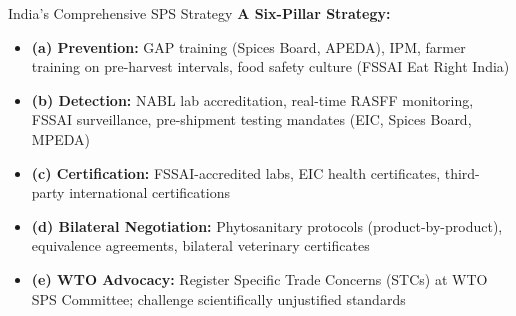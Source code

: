 \documentclass[
  ignorenonframetext,
  aspectratio=169,
]{beamer}
\makeatletter
\providecommand{\tightlist}{%
  \setlength{\itemsep}{0pt}\setlength{\parskip}{0pt}}
\let\quarto@originallabel\label
\DeclareRobustCommand*{\label}[1]{\quarto@originallabel{#1}}
\makeatother
\begin{document}
\begin{frame}{India's Comprehensive SPS Strategy}
\label{indias-comprehensive-sps-strategy}
\textbf{A Six-Pillar Strategy:}

\begin{itemize}
\tightlist
\item
  \textbf{(a) Prevention:} GAP training (Spices Board, APEDA), IPM,
  farmer training on pre-harvest intervals, food safety culture (FSSAI
  Eat Right India)
\item
  \textbf{(b) Detection:} NABL lab accreditation, real-time RASFF
  monitoring, FSSAI surveillance, pre-shipment testing mandates (EIC,
  Spices Board, MPEDA)
\item
  \textbf{(c) Certification:} FSSAI-accredited labs, EIC health
  certificates, third-party international certifications
\item
  \textbf{(d) Bilateral Negotiation:} Phytosanitary protocols
  (product-by-product), equivalence agreements, bilateral veterinary
  certificates
\item
  \textbf{(e) WTO Advocacy:} Register Specific Trade Concerns (STCs) at
  WTO SPS Committee; challenge scientifically unjustified standards
\end{itemize}

\end{frame}
\end{document}
